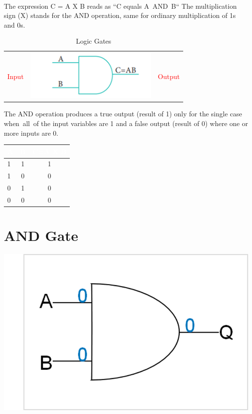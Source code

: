 \documentclass{article}
\begin{document}
\paragraph{}
The expression C = A X B reads as “C equals A AND B“ 
The multiplication sign (X) stands for the AND operation, same for ordinary multiplication of 1s and 0s.
\begin{table}[h!]
	\begin{center}
		\caption{Logic Gates}
		\label{tab:table1}
		\begin{tabular}{l c c}
			\textcolor{red}{Input}
			&
			\includegraphics[width=0.25\linewidth]{Logicpic2}
			&
			\textcolor{red}{Output}
			\\
		\end{tabular}
	\end{center}
\end{table}
The AND operation produces a true output (result of 1) only for the single case when all of the input variables are 1 and a false output (result of 0) where one or more inputs are 0.
\\
\begin{table}[h!]
	\begin{center}
		\begin{tabular}{ |l|c|c| }
			\cellcolor{blue!100}\textcolor{white}{\textbf{    A    }} & \cellcolor{blue!100}\textcolor{white}{\textbf{    B    }} & \cellcolor{blue!100}\textcolor{white}{\textbf{C=A X B}}\\
			\hline
			1 & 1 & 1\\
			1 & 0 & 0\\
			0 & 1 & 0\\
			0 & 0 & 0\\
			\hline
	
		\end{tabular}
	\end{center}
\end{table}
\section{AND Gate}
\begin{center}
	\includegraphics[width=1.2\linewidth]{and}
\end{center}
\end{document}
